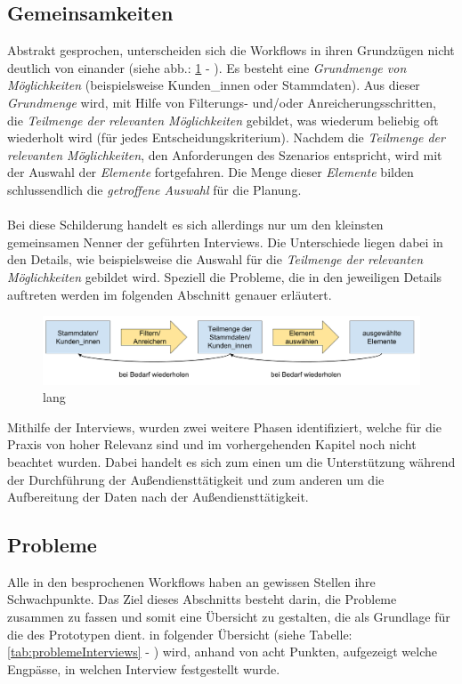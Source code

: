 \documentclass[../Bachelorarbeit.tex]{subfiles}
\begin{document}
\subsection*{Gemeinsamkeiten}
\label{subsubsec:Ergebnisse der Interviews:gemeinsamkeiten}
Abstrakt gesprochen, unterscheiden sich die Workflows in ihren Grundzügen nicht deutlich von einander (siehe abb.: \ref{fig:abstrakterWorkflowPlannung} - ). 
Es besteht eine \textit{Grundmenge von Möglichkeiten} (beispielsweise Kunden\_innen oder Stammdaten). 
Aus dieser \textit{Grundmenge} wird, mit Hilfe von Filterungs- und/oder Anreicherungsschritten, die \textit{Teilmenge der relevanten Möglichkeiten} gebildet, was wiederum beliebig oft wiederholt wird (für jedes Entscheidungskriterium).
Nachdem die \textit{Teilmenge der relevanten Möglichkeiten}, den Anforderungen des Szenarios entspricht, wird mit der Auswahl der \textit{Elemente} fortgefahren.
Die Menge dieser \textit{Elemente} bilden schlussendlich die \textit{getroffene Auswahl} für die Planung.\\
\\
Bei diese Schilderung handelt es sich allerdings nur um den kleinsten gemeinsamen Nenner der geführten Interviews.
Die Unterschiede liegen dabei in den Details, wie beispielsweise die Auswahl für die \textit{Teilmenge der relevanten Möglichkeiten} gebildet wird.
Speziell die Probleme, die in den jeweiligen Details auftreten werden im folgenden Abschnitt genauer erläutert.

\begin{figure}[h]
\includegraphics[width=\linewidth]{img/analyse/abstrakterWorkflowPlannung}
\caption[abstrakter Plannungsworkflow]{lang}
\label{fig:abstrakterWorkflowPlannung}
\end{figure}

Mithilfe der Interviews, wurden zwei weitere Phasen identifiziert, welche für die Praxis von hoher Relevanz sind und im vorhergehenden Kapitel noch nicht beachtet wurden.
Dabei handelt es sich zum einen um die Unterstützung während der Durchführung der Außendiensttätigkeit und zum anderen um die Aufbereitung der Daten nach der Außendiensttätigkeit.

\subsection*{Probleme}
\label{subsubsec:Ergebnisse der Interviews:probleme}
Alle in den  besprochenen Workflows haben an gewissen Stellen ihre Schwachpunkte. 
Das Ziel dieses Abschnitts besteht darin, die Probleme zusammen zu fassen und somit eine Übersicht zu gestalten, die als Grundlage für die  des Prototypen dient. 
in folgender Übersicht (siehe Tabelle: \ref{tab:problemeInterviews} - ) wird, anhand von acht Punkten, aufgezeigt welche Engpässe, in welchen Interview festgestellt wurde.
\end{document}
